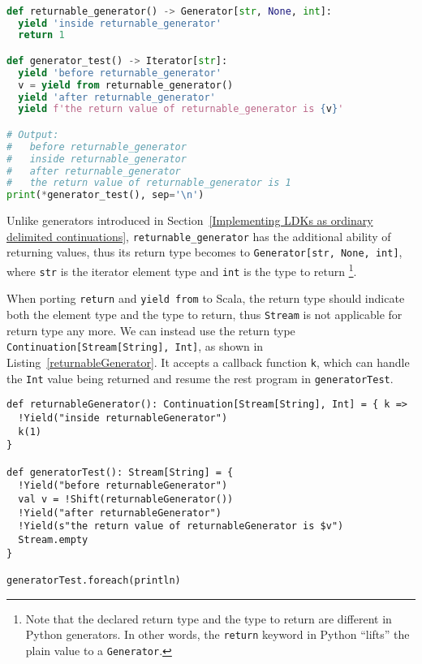 \begin{lstlisting}[language=Python,style=Python3,caption={Use \lstinline{yield from} and \lstinline{return} in Python generators},label={returnable_generator}]

def returnable_generator() -> Generator[str, None, int]:
  yield 'inside returnable_generator'
  return 1

def generator_test() -> Iterator[str]:
  yield 'before returnable_generator'
  v = yield from returnable_generator()
  yield 'after returnable_generator'
  yield f'the return value of returnable_generator is {v}'

# Output:
#   before returnable_generator
#   inside returnable_generator
#   after returnable_generator
#   the return value of returnable_generator is 1
print(*generator_test(), sep='\n')
\end{lstlisting}

Unlike generators introduced in Section~\ref{Implementing LDKs as ordinary delimited continuations}, \lstinline{returnable_generator} has the additional ability of returning values, thus its return type becomes to \lstinline{Generator[str, None, int]}, where \lstinline{str} is the iterator element type and \lstinline{int} is the type to return \footnote{Note that the declared return type and the type to return are different in Python generators. In other words, the \lstinline{return} keyword in Python ``lifts'' the plain value to a \lstinline{Generator}.}.

When porting \lstinline{return} and \lstinline{yield from} to Scala, the return type should indicate both the element type and the type to return, thus \lstinline{Stream} is not applicable for return type any more. We can instead use the return type \lstinline{Continuation[Stream[String], Int]}, as shown in Listing~\ref{returnableGenerator}. It accepts a callback function \lstinline{k}, which can handle the \lstinline{Int} value being returned and resume the rest program in \lstinline{generatorTest}.

\begin{lstlisting}[caption={Returning an additional value in LDK-based generators},label={returnableGenerator}]
def returnableGenerator(): Continuation[Stream[String], Int] = { k =>
  !Yield("inside returnableGenerator")
  k(1)
}

def generatorTest(): Stream[String] = {
  !Yield("before returnableGenerator")
  val v = !Shift(returnableGenerator())
  !Yield("after returnableGenerator")
  !Yield(s"the return value of returnableGenerator is $v")
  Stream.empty
}

generatorTest.foreach(println)
\end{lstlisting}

